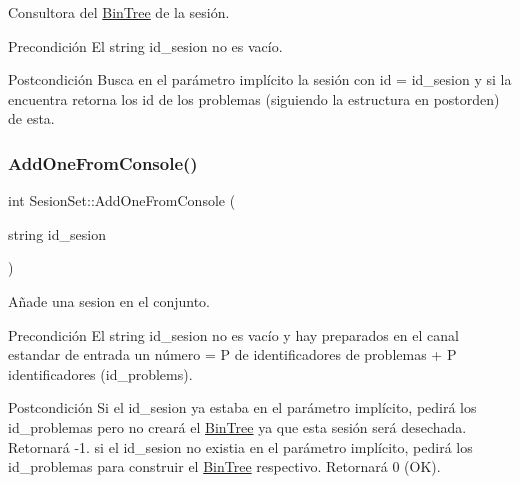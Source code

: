 Consultora del \mbox{\hyperlink{class_bin_tree}{Bin\+Tree}} de la sesión. 

\begin{DoxyPrecond}{Precondición}
El string id\+\_\+sesion no es vacío. 
\end{DoxyPrecond}
\begin{DoxyPostcond}{Postcondición}
Busca en el parámetro implícito la sesión con id = id\+\_\+sesion y si la encuentra retorna los id de los problemas (siguiendo la estructura en postorden) de esta. 
\end{DoxyPostcond}
\mbox{\label{class_sesion_set_a74a8b110d55902c12d867e090c6092c2}} 
\subsubsection{\texorpdfstring{Add\+One\+From\+Console()}{AddOneFromConsole()}}
{\footnotesize\ttfamily int Sesion\+Set\+::\+Add\+One\+From\+Console (\begin{DoxyParamCaption}\item[{string}]{id\+\_\+sesion }\end{DoxyParamCaption})}



Añade una sesion en el conjunto. 

\begin{DoxyPrecond}{Precondición}
El string id\+\_\+sesion no es vacío y hay preparados en el canal estandar de entrada un número = P de identificadores de problemas + P identificadores (id\+\_\+problems). 
\end{DoxyPrecond}
\begin{DoxyPostcond}{Postcondición}
Si el id\+\_\+sesion ya estaba en el parámetro implícito, pedirá los id\+\_\+problemas pero no creará el \mbox{\hyperlink{class_bin_tree}{Bin\+Tree}} ya que esta sesión será desechada. Retornará -\/1. si el id\+\_\+sesion no existia en el parámetro implícito, pedirá los id\+\_\+problemas para construir el \mbox{\hyperlink{class_bin_tree}{Bin\+Tree}} respectivo. Retornará 0 (OK). 
\end{DoxyPostcond}
\mbox{\label{class_sesion_set_af1acf5c32c501d5fa3e6a282ec3c176e}} 

